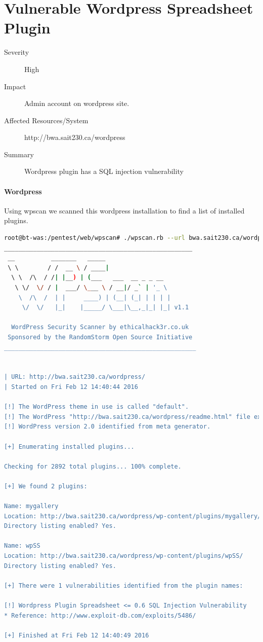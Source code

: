 \documentclass{article}
\begin{document}
\newpage
\section{Vulnerable Wordpress Spreadsheet Plugin}
\begin{description}
  \item[Severity] High
  \item[Impact] Admin account on wordpress site.
  \item[Affected Resources/System] http://bwa.sait230.ca/wordpress
  \item[Summary] Wordpress plugin has a SQL injection vulnerability
\end{description}

\paragraph{Wordpress}

Using wpscan we scanned this wordpress installation to find a list of installed plugins.

\begin{lstlisting}[language=Bash, firstline=26, lastline=39]
root@bt-was:/pentest/web/wpscan# ./wpscan.rb --url bwa.sait230.ca/wordpress --enumerate p
____________________________________________________
 __          _______   _____                  
 \ \        / /  __ \ / ____|                 
  \ \  /\  / /| |__) | (___   ___  __ _ _ __  
   \ \/  \/ / |  ___/ \___ \ / __|/ _` | '_ \ 
    \  /\  /  | |     ____) | (__| (_| | | | |
     \/  \/   |_|    |_____/ \___|\__,_|_| |_| v1.1

  WordPress Security Scanner by ethicalhack3r.co.uk
 Sponsored by the RandomStorm Open Source Initiative
_____________________________________________________


| URL: http://bwa.sait230.ca/wordpress/
| Started on Fri Feb 12 14:40:44 2016

[!] The WordPress theme in use is called "default".
[!] The WordPress "http://bwa.sait230.ca/wordpress/readme.html" file exists.
[!] WordPress version 2.0 identified from meta generator.

[+] Enumerating installed plugins...

Checking for 2892 total plugins... 100% complete.

[+] We found 2 plugins:

Name: mygallery
Location: http://bwa.sait230.ca/wordpress/wp-content/plugins/mygallery/
Directory listing enabled? Yes.

Name: wpSS
Location: http://bwa.sait230.ca/wordpress/wp-content/plugins/wpSS/
Directory listing enabled? Yes.

[+] There were 1 vulnerabilities identified from the plugin names:

[!] Wordpress Plugin Spreadsheet <= 0.6 SQL Injection Vulnerability
* Reference: http://www.exploit-db.com/exploits/5486/

[+] Finished at Fri Feb 12 14:40:49 2016
\end{lstlisting}
\end{document}
